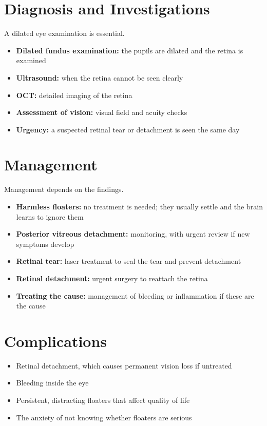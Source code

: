 \section*{Diagnosis and Investigations}
A dilated eye examination is essential.
\begin{itemize}
    \item \textbf{Dilated fundus examination:} the pupils are dilated and the retina is examined
    \item \textbf{Ultrasound:} when the retina cannot be seen clearly
    \item \textbf{OCT:} detailed imaging of the retina
    \item \textbf{Assessment of vision:} visual field and acuity checks
    \item \textbf{Urgency:} a suspected retinal tear or detachment is seen the same day
\end{itemize}

\section*{Management}
Management depends on the findings.
\begin{itemize}
    \item \textbf{Harmless floaters:} no treatment is needed; they usually settle and the brain learns to ignore them
    \item \textbf{Posterior vitreous detachment:} monitoring, with urgent review if new symptoms develop
    \item \textbf{Retinal tear:} laser treatment to seal the tear and prevent detachment
    \item \textbf{Retinal detachment:} urgent surgery to reattach the retina
    \item \textbf{Treating the cause:} management of bleeding or inflammation if these are the cause
\end{itemize}

\section*{Complications}
\begin{itemize}
    \item Retinal detachment, which causes permanent vision loss if untreated
    \item Bleeding inside the eye
    \item Persistent, distracting floaters that affect quality of life
    \item The anxiety of not knowing whether floaters are serious
\end{itemize}


